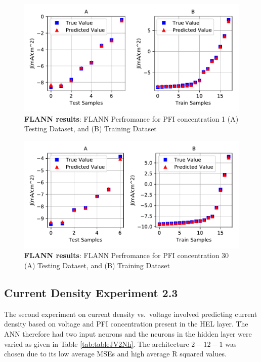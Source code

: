 \documentclass[]{article}
\begin{document}
\begin{figure}
\centering
\includegraphics{Report_files/figure-latex/JVflannplot1-1.pdf}
\caption{\label{fig:JVflannplot1}\textbf{FLANN results}: FLANN Perfromance for PFI concentration 1 (A) Testing Dataset, and (B) Training Dataset}
\end{figure}

\begin{figure}
\centering
\includegraphics{Report_files/figure-latex/JVflannplot30-1.pdf}
\caption{\label{fig:JVflannplot30}\textbf{FLANN results}: FLANN Perfromance for PFI concentration 30 (A) Testing Dataset, and (B) Training Dataset}
\end{figure}

\newpage

\hypertarget{current-density-experiment-2.3}{%
\subsection{Current Density Experiment 2.3}\label{current-density-experiment-2.3}}

The second experiment on current density vs.~voltage involved predicting current density based on voltage and PFI concentration present in the HEL layer. The ANN therefore had two input neurons and the neurons in the hidden layer were varied as given in Table \ref{tab:tableJV2Nh}. The architecture \({2-12-1}\) was chosen due to its low average MSEs and high average R squared values.
\end{document}
